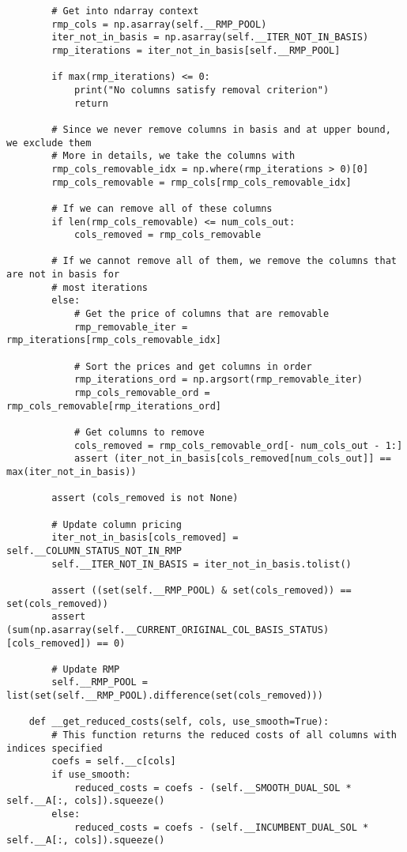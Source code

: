 \documentclass{article}
\begin{document}
\begin{lstlisting}
        # Get into ndarray context
        rmp_cols = np.asarray(self.__RMP_POOL)
        iter_not_in_basis = np.asarray(self.__ITER_NOT_IN_BASIS)
        rmp_iterations = iter_not_in_basis[self.__RMP_POOL]

        if max(rmp_iterations) <= 0:
            print("No columns satisfy removal criterion")
            return

        # Since we never remove columns in basis and at upper bound, we exclude them
        # More in details, we take the columns with
        rmp_cols_removable_idx = np.where(rmp_iterations > 0)[0]
        rmp_cols_removable = rmp_cols[rmp_cols_removable_idx]

        # If we can remove all of these columns
        if len(rmp_cols_removable) <= num_cols_out:
            cols_removed = rmp_cols_removable

        # If we cannot remove all of them, we remove the columns that are not in basis for
        # most iterations
        else:
            # Get the price of columns that are removable
            rmp_removable_iter = rmp_iterations[rmp_cols_removable_idx]

            # Sort the prices and get columns in order
            rmp_iterations_ord = np.argsort(rmp_removable_iter)
            rmp_cols_removable_ord = rmp_cols_removable[rmp_iterations_ord]

            # Get columns to remove
            cols_removed = rmp_cols_removable_ord[- num_cols_out - 1:]
            assert (iter_not_in_basis[cols_removed[num_cols_out]] == max(iter_not_in_basis))

        assert (cols_removed is not None)

        # Update column pricing
        iter_not_in_basis[cols_removed] = self.__COLUMN_STATUS_NOT_IN_RMP
        self.__ITER_NOT_IN_BASIS = iter_not_in_basis.tolist()

        assert ((set(self.__RMP_POOL) & set(cols_removed)) == set(cols_removed))
        assert (sum(np.asarray(self.__CURRENT_ORIGINAL_COL_BASIS_STATUS)[cols_removed]) == 0)

        # Update RMP
        self.__RMP_POOL = list(set(self.__RMP_POOL).difference(set(cols_removed)))

    def __get_reduced_costs(self, cols, use_smooth=True):
        # This function returns the reduced costs of all columns with indices specified
        coefs = self.__c[cols]
        if use_smooth:
            reduced_costs = coefs - (self.__SMOOTH_DUAL_SOL * self.__A[:, cols]).squeeze()
        else:
            reduced_costs = coefs - (self.__INCUMBENT_DUAL_SOL * self.__A[:, cols]).squeeze()


\end{lstlisting}
\end{document}
